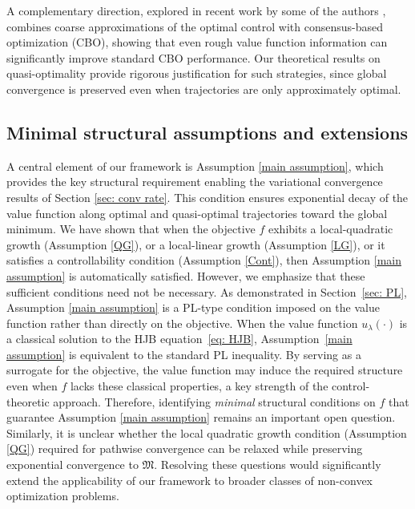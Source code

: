 \documentclass[12pt]{amsart}
\numberwithin{equation}{section}
\theoremstyle{plain}
\begin{document}
A complementary direction, explored in recent work by some of the authors \cite{huang2024fast}, combines coarse approximations of the optimal control with consensus-based optimization (CBO), showing that even rough value function information can significantly improve standard CBO performance. Our theoretical results on quasi-optimality provide rigorous justification for such strategies, since global convergence is preserved even when trajectories are only approximately optimal.

\subsection*{Minimal structural assumptions and extensions}
A central element of our framework is Assumption \ref{main assumption}, which provides the key structural requirement enabling the variational convergence results of Section \ref{sec: conv rate}. This condition ensures exponential decay of the value function along optimal and quasi-optimal trajectories toward the global minimum. We have shown that when the objective 
$f$ exhibits a local-quadratic growth (Assumption \ref{QG}), or a local-linear growth (Assumption \ref{LG}), or it satisfies a controllability condition (Assumption \ref{Cont}),  then Assumption \ref{main assumption} is automatically satisfied. However, we emphasize that these sufficient conditions need not be necessary.  As demonstrated in Section~\ref{sec: PL},  Assumption \ref{main assumption} is a PL-type condition imposed on the value function rather than directly on the objective. When the value function $u_\lambda(\cdot)$ is a classical solution to the HJB equation~\eqref{eq: HJB}, Assumption~\ref{main assumption} is equivalent to the standard PL inequality.  By serving as a surrogate for the objective, the value function may induce the required structure even when $f$ lacks these classical properties, a key strength of the control-theoretic approach. Therefore, identifying \textit{minimal} structural conditions on $f$ that guarantee Assumption \ref{main assumption} remains an important open question. Similarly, it is unclear whether the local quadratic growth condition (Assumption \ref{QG}) required for pathwise convergence can be relaxed while preserving exponential convergence to $\mathfrak{M}$. Resolving these questions would significantly extend the applicability of our framework to broader classes of non-convex optimization problems.
\end{document}
